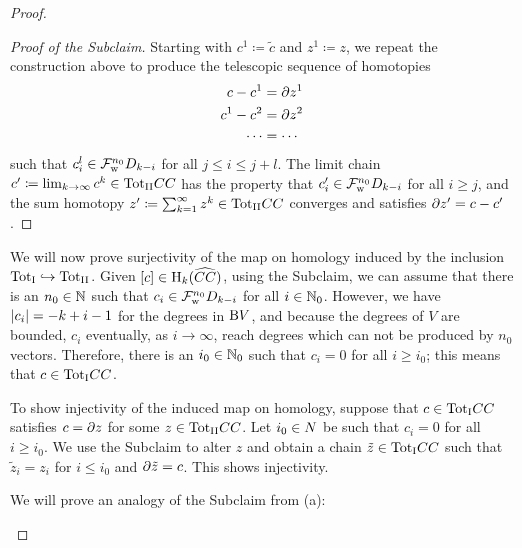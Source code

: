 \documentclass[\MainFolder/Text.tex]{subfiles}
\begin{document}
\begin{proof}
\begin{ProofList}
\begin{proof}[Proof of the Subclaim]
Starting with $c^{1} \coloneqq \tilde{c}$ and $z^{1} \coloneqq z$, we repeat the construction above to produce the telescopic sequence of homotopies
\begin{align*}
c - c^{1} & = \partial z^{1} \\
c^{1} - c^{2} & = \partial z^{2} \\
\dotsb &= \dotsb 
\end{align*}
such that $c^l_i\in \mathcal{F}^{n_0}_{\mathrm{w}} D_{k-i}$ for all $j\le i\le j+l$. The limit chain $c'\coloneqq \lim_{k\to\infty} c^{k} \in {\mathrm{Tot}_{\mathrm{II}}}CC$ has the property that $c'_i \in \mathcal{F}^{n_0}_{\mathrm{w}}D_{k-i}$ for all $i\ge j$, and the sum homotopy $z' \coloneqq \sum_{k=1}^\infty z^k \in {\mathrm{Tot}_{\mathrm{II}}} CC$ converges and satisfies $\partial z' = c-c'$.
\end{proof}

We will now prove surjectivity of the map on homology induced by the inclusion ${\mathrm{Tot}_{\mathrm{I}}} \hookrightarrow {\mathrm{Tot}_{\mathrm{II}}}$. Given $[c]\in \mathrm{H}_k(\widehat{CC})$, using the Subclaim, we can assume that there is an $n_0\in\mathbb{N}$ such that $c_i\in \mathcal{F}^{n_0}_{\mathrm{w}}D_{k-i}$ for all $i\in\mathbb{N}_0$. However, we have $|c_i| = -k+i-1$ for the degrees in $\mathrm{B} V$, and because the degrees of $V$ are bounded, $c_i$ eventually, as $i\to \infty$, reach degrees which can not be produced by $n_0$ vectors. Therefore, there is an $i_0\in \mathbb{N}_0$ such that $c_i = 0$ for all $i\ge i_0$; this means that $c \in {\mathrm{Tot}_{\mathrm{I}}} CC$.

To show injectivity of the induced map on homology, suppose that $c\in {\mathrm{Tot}_{\mathrm{I}}} CC$ satisfies $c=\partial z$ for some $z\in {\mathrm{Tot}_{\mathrm{II}}} CC$. Let $i_0\in N$ be such that $c_i = 0$ for all $i\ge i_0$. We use the Subclaim to alter $z$ and obtain a chain $\tilde{z}\in{\mathrm{Tot}_{\mathrm{I}}} CC$ such that $\tilde{z}_{i} = z_i$ for $i\le i_0$ and $\partial \tilde{z} = c$. This shows injectivity.

\item We will prove an analogy of the Subclaim from (a):


\end{ProofList}
\end{proof}
\end{document}
